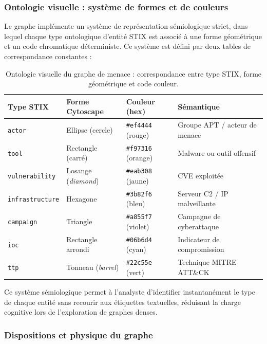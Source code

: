 \subsubsection{Ontologie visuelle : système de formes et de couleurs}

Le graphe implémente un système de représentation sémiologique strict, dans lequel chaque type ontologique d'entité STIX est associé à une forme géométrique et un code chromatique déterministe. Ce système est défini par deux tables de correspondance constantes :

\begin{table}[H]
\centering
\caption{Ontologie visuelle du graphe de menace : correspondance entre type STIX, forme géométrique et code couleur.}
\label{tab:ontologie-graphe}
\begin{tabular}{|l|l|l|l|}
\hline
\textbf{Type STIX} & \textbf{Forme Cytoscape} & \textbf{Couleur (hex)} & \textbf{Sémantique} \\
\hline
\texttt{actor} & Ellipse (cercle) & \texttt{\#ef4444} (rouge) & Groupe APT / acteur de menace \\
\hline
\texttt{tool} & Rectangle (carré) & \texttt{\#f97316} (orange) & Malware ou outil offensif \\
\hline
\texttt{vulnerability} & Losange (\textit{diamond}) & \texttt{\#eab308} (jaune) & CVE exploitée \\
\hline
\texttt{infrastructure} & Hexagone & \texttt{\#3b82f6} (bleu) & Serveur C2 / IP malveillante \\
\hline
\texttt{campaign} & Triangle & \texttt{\#a855f7} (violet) & Campagne de cyberattaque \\
\hline
\texttt{ioc} & Rectangle arrondi & \texttt{\#06b6d4} (cyan) & Indicateur de compromission \\
\hline
\texttt{ttp} & Tonneau (\textit{barrel}) & \texttt{\#22c55e} (vert) & Technique MITRE ATT\&CK \\
\hline
\end{tabular}
\end{table}

Ce système sémiologique permet à l'analyste d'identifier instantanément le type de chaque entité sans recourir aux étiquettes textuelles, réduisant la charge cognitive lors de l'exploration de graphes denses.

\subsubsection{Dispositions et physique du graphe}

